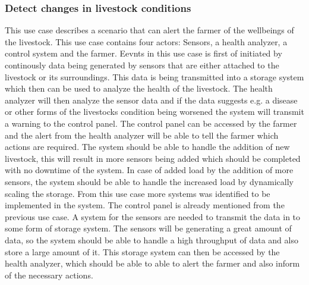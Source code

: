 \subsubsection{Detect changes in livestock conditions}
This use case describes a scenario that can alert the farmer of the wellbeings of the livestock. This use case contains four actors: Sensors, a health analyzer, a control system and the farmer.
Eevnts in this use case is first of initiated by continously data being generated by sensors that are either attached to the livestock or its surroundings. This data is being transmitted into a storage system which then can be used to analyze the health of the livestock.
The health analyzer will then analyze the sensor data and if the data suggests e.g. a disease or other forms of the livestocks condition being worsened the system will transmit a warning to the control panel.
The control panel can be accessed by the farmer and the alert from the health analyzer will be able to tell the farmer which actions are required. The system should be able to handle the addition of new livestock, this will result in more sensors being added which should be completed with no downtime of the system.
In case of added load by the addition of more sensors, the system should be able to handle the increased load by dynamically scaling the storage. \vspace{2mm} \newline
From this use case more systems was identified to be implemented in the system. The control panel is already mentioned from the previous use case.
A system for the sensors are needed to transmit the data in to some form of storage system. The sensors will be generating a great amount of data, so the system should be able to handle a high throughput of data and also store a large amount of it.
This storage system can then be accessed by the health analyzer, which should be able to able to alert the farmer and also inform of the necessary actions. \newline


